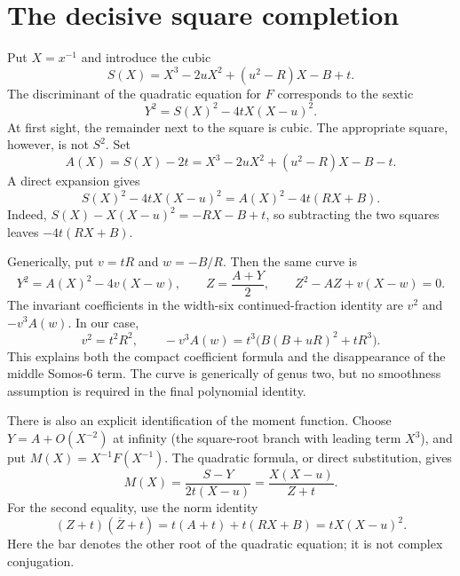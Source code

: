 \documentclass[11pt,a4paper]{article}
\numberwithin{equation}{section}
\theoremstyle{definition}
\begin{document}
\section{The decisive square completion}

Put $X=x^{-1}$ and introduce the cubic
\begin{equation}\label{eq:S}
 S(X)=X^3-2uX^2+(u^2-R)X-B+t.
\end{equation}
The discriminant of the quadratic equation for $F$ corresponds to the
sextic
\begin{equation}\label{eq:sextic}
 Y^2=S(X)^2-4tX(X-u)^2.
\end{equation}
At first sight, the remainder next to the square is cubic. The appropriate
square, however, is not $S^2$. Set
\begin{equation}\label{eq:A}
 A(X)=S(X)-2t
 =X^3-2uX^2+(u^2-R)X-B-t.
\end{equation}
A direct expansion gives
\begin{equation}\label{eq:squarecomplete}
 \boxed{\ S(X)^2-4tX(X-u)^2=A(X)^2-4t(RX+B).\ }
\end{equation}
Indeed, $S(X)-X(X-u)^2=-RX-B+t$, so subtracting the two
squares leaves $-4t(RX+B)$.

Generically, put $v=tR$ and $w=-B/R$. Then the same curve is
\begin{equation}\label{eq:curve}
 Y^2=A(X)^2-4v(X-w),\qquad
 Z=\frac{A+Y}{2},\qquad Z^2-AZ+v(X-w)=0.
\end{equation}
The invariant coefficients in the width-six continued-fraction identity are
$v^2$ and $-v^3A(w)$. In our case,
\begin{equation}\label{eq:invariants}
 v^2=t^2R^2,\qquad
 -v^3A(w)=t^3\bigl(B(B+uR)^2+tR^3\bigr).
\end{equation}
This explains both the compact coefficient formula and the disappearance of
the middle Somos-6 term. The curve is generically of genus two, but no
smoothness assumption is required in the final polynomial identity.

There is also an explicit identification of the moment function. Choose
$Y=A+O(X^{-2})$ at infinity (the square-root branch with leading term $X^3$), and put $M(X)=X^{-1}F(X^{-1})$. The quadratic
formula, or direct substitution, gives
\begin{equation}\label{eq:Mcurve}
 M(X)=\frac{S-Y}{2t(X-u)}=\frac{X(X-u)}{Z+t}.
\end{equation}
For the second equality, use the norm identity
\begin{equation}\label{eq:initialnorm}
 (Z+t)(\overline Z+t)=t(A+t)+t(RX+B)=tX(X-u)^2.
\end{equation}
Here the bar denotes the other root of the quadratic equation; it is not
complex conjugation.
\end{document}
